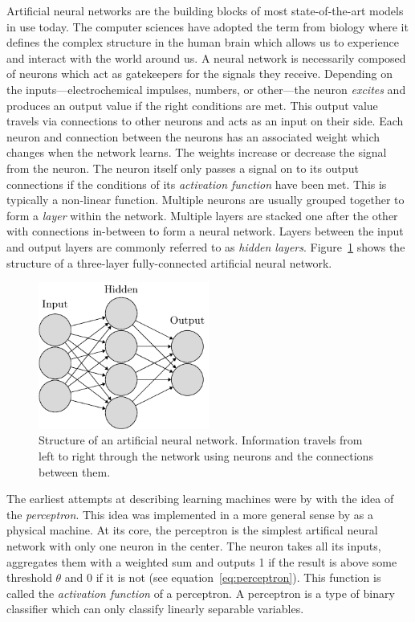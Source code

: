 \documentclass[draft,final]{vutinfth} %
\begin{document}
Artificial neural networks are the building blocks of most
state-of-the-art models in use today. The computer sciences have
adopted the term from biology where it defines the complex structure
in the human brain which allows us to experience and interact with the
world around us. A neural network is necessarily composed of neurons
which act as gatekeepers for the signals they receive. Depending on
the inputs—electrochemical impulses, numbers, or other—the neuron
\emph{excites} and produces an output value if the right conditions
are met. This output value travels via connections to other neurons
and acts as an input on their side. Each neuron and connection between
the neurons has an associated weight which changes when the network
learns. The weights increase or decrease the signal from the
neuron. The neuron itself only passes a signal on to its output
connections if the conditions of its \emph{activation function} have
been met. This is typically a non-linear function. Multiple neurons
are usually grouped together to form a \emph{layer} within the
network. Multiple layers are stacked one after the other with
connections in-between to form a neural network. Layers between the
input and output layers are commonly referred to as \emph{hidden
layers}. Figure~\ref{fig:neural-network} shows the structure of a
three-layer fully-connected artificial neural network.

\begin{figure}
  \centering
  \includegraphics[width=0.5\textwidth]{graphics/neural-network/neural-network.pdf}
  \caption[Structure of an artificial neural network]{Structure of an
    artificial neural network. Information travels from left to right
    through the network using neurons and the connections between
    them.}
  \label{fig:neural-network}
\end{figure}

The earliest attempts at describing learning machines were by
\textcite{mcculloch1943} with the idea of the \emph{perceptron}. This
idea was implemented in a more general sense by
\textcite{rosenblatt1957,rosenblatt1962} as a physical machine. At its
core, the perceptron is the simplest artifical neural network with
only one neuron in the center. The neuron takes all its inputs,
aggregates them with a weighted sum and outputs 1 if the result is
above some threshold $\theta$ and 0 if it is not (see
equation~\ref{eq:perceptron}). This function is called the
\emph{activation function} of a perceptron. A perceptron is a type of
binary classifier which can only classify linearly separable
variables.
\end{document}

